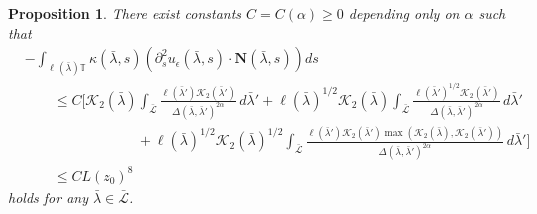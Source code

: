 \documentclass[reqno,centertags,12pt]{amsart}
\newtheorem{proposition}[theorem]{Proposition}
\theoremstyle{definition}
\numberwithin{equation}{section}
\newcommand{\bbT}{{\mathbb{T}}}
\begin{document}
\begin{proposition}
    There exist constants $C=C(\alpha)\geq 0$ depending only on $\alpha$ such that
    \begin{align*}
        &-\int_{\ell(\bar{\lambda})\bbT}
        \kappa(\bar{\lambda},s)
        \left(
            \partial_{s}^{2}u_{\epsilon}(\bar{\lambda},s)
            \cdot \mathbf{N}(\bar{\lambda},s)
        \right)
        ds
        \\&\quad\quad \leq
        C\bigg[
            \mathcal{K}_{2}(\bar{\lambda})
            \int_{\bar{\mathcal{L}}}
            \frac{\ell(\bar{\lambda}')\mathcal{K}_{2}(\bar{\lambda}')}
            {\Delta(\bar{\lambda},\bar{\lambda}')^{2\alpha}}
            \,d\bar{\lambda}'
            + \ell(\bar{\lambda})^{1/2}\mathcal{K}_{2}(\bar{\lambda})
            \int_{\bar{\mathcal{L}}}
            \frac{\ell(\bar{\lambda}')^{1/2}\mathcal{K}_{2}(\bar{\lambda}')}
            {\Delta(\bar{\lambda},\bar{\lambda}')^{2\alpha}}
            \,d\bar{\lambda}'
            \\&\quad\quad\quad\quad\quad\quad\quad\quad
            + \ell(\bar{\lambda})^{1/2}\mathcal{K}_{2}(\bar{\lambda})^{1/2}
            \int_{\bar{\mathcal{L}}}
            \frac{\ell(\bar{\lambda}') \mathcal{K}_{2}(\bar{\lambda}')
            \max\left(\mathcal{K}_{2}(\bar{\lambda}), \mathcal{K}_{2}(\bar{\lambda}')\right)}
            {\Delta(\bar{\lambda},\bar{\lambda}')^{2\alpha}}
            \,d\bar{\lambda}'
        \bigg] \\
        &\quad\quad\leq CL(z_{0})^{8}
    \end{align*}
    holds for any $\bar{\lambda}\in\bar{\mathcal{L}}$.
\end{proposition}
\end{document}
